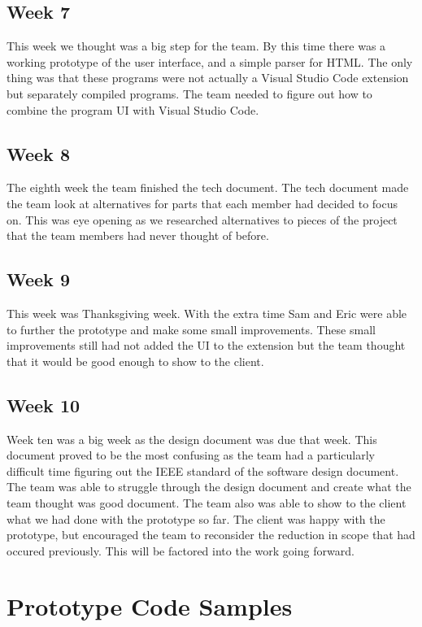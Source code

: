 \documentclass[letterpaper,10pt,titlepage,draftclsnofoot,onecolumn,onesided] {IEEEtran}
\begin{document}
	\subsection{Week 7}
	This week we thought was a big step for the team. 
 	By this time there was a working prototype of the user interface, and a simple parser for HTML.
	The only thing was that these programs were not actually a Visual Studio Code extension but separately compiled programs.
	The team needed to figure out how to combine the program UI with Visual Studio Code.
	
	\subsection{Week 8}
	The eighth week the team finished the tech document.
	The tech document made the team look at alternatives for parts that each member had decided to focus on.
	This was eye opening as we researched alternatives to pieces of the project that the team members had never thought of before.
	
	\subsection{Week 9}
	This week was Thanksgiving week. 
	With the extra time Sam and Eric were able to further the prototype and make some small improvements.
	These small improvements still had not added the UI to the extension but the team thought that it would be good enough to show to the client. 

	\subsection{Week 10}
	Week ten was a big week as the design document was due that week. 
	This document proved to be the most confusing as the team had a particularly difficult time figuring out the IEEE standard of the software design document. 
	The team was able to struggle through the design document and create what the team thought was good document. 
	The team also was able to show to the client what we had done with the prototype so far. 
	The client was happy with the prototype, but encouraged the team to reconsider the reduction in scope that had occured previously.
	This will be factored into the work going forward.
	
\section{Prototype Code Samples}
	
\end{document}
